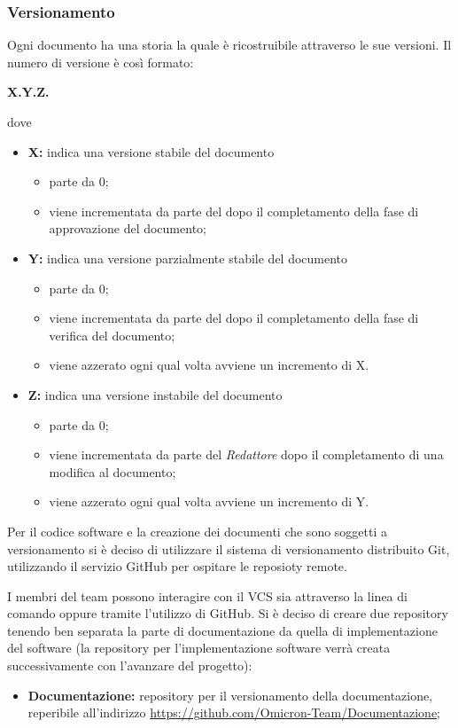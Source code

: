 \subsubsection{Versionamento}
Ogni documento ha una storia la quale è ricostruibile attraverso le sue versioni. Il numero di versione è così formato:
\begin{center}
\textbf{X.Y.Z.}
\end{center}
dove
\begin{itemize}
 \item \textbf{X:} indica una versione stabile del documento
 	\begin{itemize}
 		\item parte da 0;
 		\item viene incrementata da parte del \respProg{} dopo il completamento della fase di approvazione del documento;
 	\end{itemize}
 \item \textbf{Y:}  indica una versione parzialmente stabile del documento
 	\begin{itemize}
 		\item parte da 0;
 		\item viene incrementata da parte del \verifProg{} dopo il completamento della fase di verifica del documento;
 		\item viene azzerato ogni qual volta avviene un incremento di X.
 	\end{itemize}
 \item \textbf{Z:} indica una versione instabile del documento
 \begin{itemize}
 		\item parte da 0;
 		\item viene incrementata da parte del \emph{Redattore} dopo il completamento di una modifica al documento;
 		\item viene azzerato ogni qual volta avviene un incremento di Y.
 	\end{itemize}
\end{itemize}

Per il codice software e la creazione dei documenti che sono soggetti a versionamento si è deciso di utilizzare il sistema di versionamento distribuito Git, utilizzando il servizio GitHub per ospitare le reposioty remote.


I membri del team \Omicron{} possono interagire con il VCS sia attraverso la linea di comando oppure tramite l'utilizzo di GitHub. Si è deciso di creare due repository tenendo ben separata la parte di documentazione da quella di implementazione del software (la repository per l'implementazione software verrà creata successivamente con l'avanzare del progetto):
\begin{itemize}
 \item \textbf{Documentazione:} repository per il versionamento della documentazione, reperibile all'indirizzo \url{https://github.com/Omicron-Team/Documentazione};
\end{itemize}

